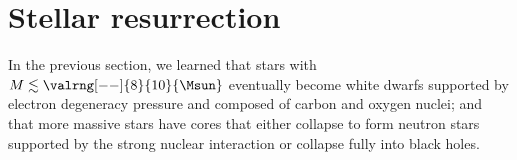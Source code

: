 \section{Stellar resurrection}
\label{s.stellar-resurrection}

In the previous section, we learned that stars with $M\lesssim\valrng[--]{8}{10}{\Msun}$ eventually become white dwarfs supported by electron degeneracy pressure and composed of carbon and oxygen nuclei; and that more massive stars have cores that either collapse to form neutron stars supported by the strong nuclear interaction or collapse fully into black holes.


